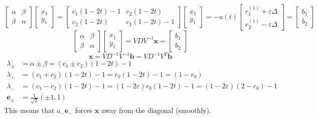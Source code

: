 \begin{equation}
	\begin{bmatrix}
		\alpha & \beta\\
		\beta & \alpha
	\end{bmatrix}
	\begin{bmatrix}
		x_1\\y_1
	\end{bmatrix}
	=
	\begin{bmatrix}
		c_1(1-2t) - 1 & c_2  (1-2t)\\
		c_2(1-2t) & c_1(1-2t) - 1
	\end{bmatrix}
	\begin{bmatrix}
	    x_1\\y_1
	\end{bmatrix}
	= 
	-u(t)
	\begin{bmatrix}
		r_1^{(1)} + \varepsilon \Delta\\
		r_2^{(1)} - \varepsilon \Delta
	\end{bmatrix}
	=
	\begin{bmatrix}
	    b_1\\b_2
	\end{bmatrix}
\end{equation}
\begin{equation}
	\begin{bmatrix}
		\alpha & \beta\\
		\beta & \alpha
	\end{bmatrix}
	\begin{bmatrix}
		x_1\\y_1
	\end{bmatrix}
	=
	VDV^{-1}
	\symbf{x}
	=
	\begin{bmatrix}
	    b_1\\b_2
	\end{bmatrix}
\end{equation}
\begin{equation}
	\symbf{x} = VD^{-1}V^{-1} \symbf{b} = VD^{-1}V^T\symbf{b}
\end{equation}
\begin{align}
	\lambda_\pm &= \alpha \pm \beta = (c_1 \pm c_2)(1-2t) - 1 \\
	\lambda_+ &= (c_1 + c_2)(1-2t) - 1= r_0(1-2t)-1  = (1-r_0)\\
	\lambda_- &= (c_1 - c_2)(1-2t) - 1= (1-2\varepsilon)r_0(1-2t)-1 = (1-2\varepsilon)(2-r_0) - 1\\
	\symbf{e}_\pm &= \frac{1}{\sqrt{2}}(\pm 1, 1)
\end{align}
This means that $a_-\symbf{e}_-$ forces $\symbf{x}$ away from the diagonal (smoothly).
